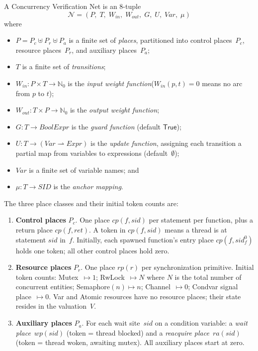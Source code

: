 \begin{definition}
\label{def:cvn}
A Concurrency Verification Net is an 8-tuple
\[
  \mathcal{N}=(P,\;T,\;W_{\!\mathit{in}},\;W_{\!\mathit{out}},\;
    G,\;U,\;\mathit{Var},\;\mu)
\]
where
\begin{itemize}
  \item $P=P_c\uplus P_r\uplus P_a$ is a finite set of \emph{places}, partitioned into control places~$P_c$, resource places~$P_r$, and auxiliary places~$P_a$;
  \item $T$ is a finite set of \emph{transitions};
  \item $W_{\!\mathit{in}}:P\times T\to\mathbb{N}_0$ is the \emph{input weight function}($W_{\!\mathit{in}}(p,t)=0$ means no arc from $p$ to $t$);
  \item $W_{\!\mathit{out}}:T\times P\to\mathbb{N}_0$ is the \emph{output weight function};
  \item $G:T\to\mathit{BoolExpr}$ is the \emph{guard function} (default $\textsf{True}$);
  \item $U:T\to(\mathit{Var}\rightharpoonup\mathit{Expr})$ is the \emph{update function}, assigning each transition a
        partial map from variables to expressions (default~$\emptyset$);
  \item $\mathit{Var}$ is a finite set of variable names; and
  \item $\mu:T\to\mathit{SID}$ is the \emph{anchor mapping}.
\end{itemize}
\end{definition}

\begin{remark}
\label{rem:places}
The three place classes and their initial token counts are:
\begin{enumerate}
  \item \textbf{Control places} $P_c$. One place $\mathit{cp}(f,\mathit{sid})$ per statement per function, plus a return place $\mathit{cp}(f,\mathit{ret})$. A token in $\mathit{cp}(f,\mathit{sid})$ means a thread is at statement $\mathit{sid}$ in~$f$. Initially, each spawned function's entry place $\mathit{cp}(f,\mathit{sid}^{0}_{f})$ holds one token; all other control places hold zero.

  \item \textbf{Resource places} $P_r$. One place $\mathit{rp}(r)$ per synchronization primitive. Initial token counts:
    Mutex~$\mapsto1$;\; RwLock~$\mapsto N$ where $N$ is the total number of concurrent entities;\; Semaphore$(n)\mapsto n$;\;
    Channel~$\mapsto 0$;\; Condvar signal place~$\mapsto 0$. \textsf{Var} and \textsf{Atomic} resources have no resource
    places; their state resides in the valuation~$V$.

  \item \textbf{Auxiliary places} $P_a$. For each \textsf{wait} site~$\mathit{sid}$ on a condition variable: a \emph{wait place}~$\mathit{wp}(\mathit{sid})$ (token = thread blocked) and a \emph{reacquire place}~$\mathit{ra}(\mathit{sid})$ (token = thread woken, awaiting mutex). All auxiliary places start at zero.
\end{enumerate}
\end{remark}

